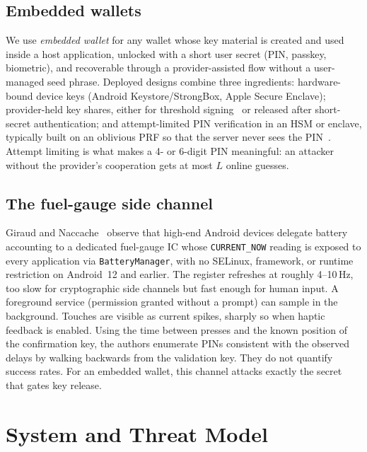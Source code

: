 \documentclass[11pt]{article}
\theoremstyle{remark}
\begin{document}
\subsection{Embedded wallets}
We use \emph{embedded wallet} for any wallet whose key material is created and used inside a host application, unlocked with a short user secret (PIN, passkey, biometric), and recoverable through a provider-assisted flow without a user-managed seed phrase. Deployed designs combine three ingredients: hardware-bound device keys (Android Keystore/StrongBox, Apple Secure Enclave); provider-held key shares, either for threshold signing~\cite{gg18,frost20} or released after short-secret authentication; and attempt-limited PIN verification in an HSM or enclave, typically built on an oblivious PRF so that the server never sees the PIN~\cite{opaque18}. Attempt limiting is what makes a 4- or 6-digit PIN meaningful: an attacker without the provider's cooperation gets at most $L$ online guesses.

\subsection{The fuel-gauge side channel}
Giraud and Naccache~\cite{gn23} observe that high-end Android devices delegate battery accounting to a dedicated fuel-gauge IC whose \texttt{CURRENT\_NOW} reading is exposed to every application via \texttt{BatteryManager}, with no SELinux, framework, or runtime restriction on Android~12 and earlier. The register refreshes at roughly 4--10\,Hz, too slow for cryptographic side channels but fast enough for human input. A foreground service (permission granted without a prompt) can sample in the background. Touches are visible as current spikes, sharply so when haptic feedback is enabled. Using the time between presses and the known position of the confirmation key, the authors enumerate PINs consistent with the observed delays by walking backwards from the validation key. They do not quantify success rates. For an embedded wallet, this channel attacks exactly the secret that gates key release.

\section{System and Threat Model}
\label{sec:model}
\end{document}
